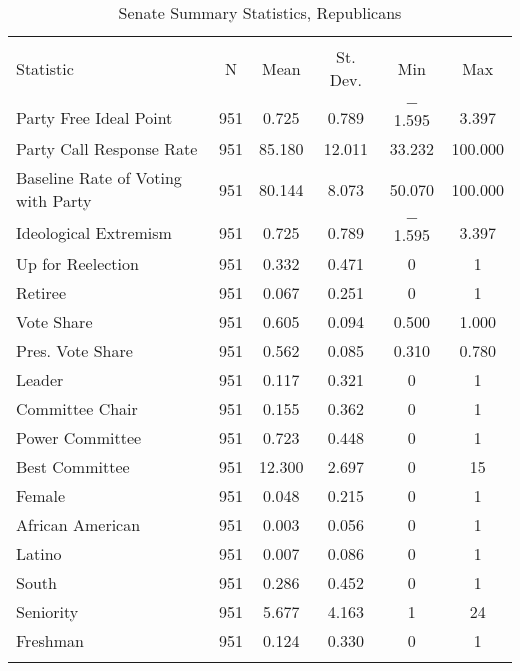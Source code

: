 \documentclass[12pt]{article}
\begin{document}
\begin{table}[H] 
	\centering 
	\singlespacing
	\caption{Senate Summary Statistics, Republicans} 
	\label{} 
	\begin{tabular}{@{\extracolsep{5pt}}lccccc} 
		\\[-1.8ex]\hline 
		\hline \\[-1.8ex] 
		Statistic & \multicolumn{1}{c}{N} & \multicolumn{1}{c}{Mean} & \multicolumn{1}{c}{St. Dev.} & \multicolumn{1}{c}{Min} & \multicolumn{1}{c}{Max} \\ 
		\hline \\[-1.8ex] 
		Party Free Ideal Point & 951 & 0.725 & 0.789 & $-$1.595 & 3.397 \\ 
		Party Call Response Rate & 951 & 85.180 & 12.011 & 33.232 & 100.000 \\ 
		Baseline Rate of Voting with Party & 951 & 80.144 & 8.073 & 50.070 & 100.000 \\ 
		Ideological Extremism & 951 & 0.725 & 0.789 & $-$1.595 & 3.397 \\ 
		
		Up for Reelection & 951 & 0.332 & 0.471 & 0 & 1 \\ 
		Retiree & 951 & 0.067 & 0.251 & 0 & 1 \\ 
		Vote Share & 951 & 0.605 & 0.094 & 0.500 & 1.000 \\ 
		Pres. Vote Share & 951 & 0.562 & 0.085 & 0.310 & 0.780 \\ 
		Leader & 951 & 0.117 & 0.321 & 0 & 1 \\ 
		Committee Chair & 951 & 0.155 & 0.362 & 0 & 1 \\ 
		Power Committee & 951 & 0.723 & 0.448 & 0 & 1 \\ 
		Best Committee & 951 & 12.300 & 2.697 & 0 & 15 \\ 
		Female & 951 & 0.048 & 0.215 & 0 & 1 \\ 
		African American & 951 & 0.003 & 0.056 & 0 & 1 \\ 
		Latino & 951 & 0.007 & 0.086 & 0 & 1 \\ 
		South & 951 & 0.286 & 0.452 & 0 & 1 \\ 
		Seniority & 951 & 5.677 & 4.163 & 1 & 24 \\ 
		Freshman & 951 & 0.124 & 0.330 & 0 & 1 \\ 
		\hline \\[-1.8ex] 
	\end{tabular} 
\end{table} 
\end{document}
